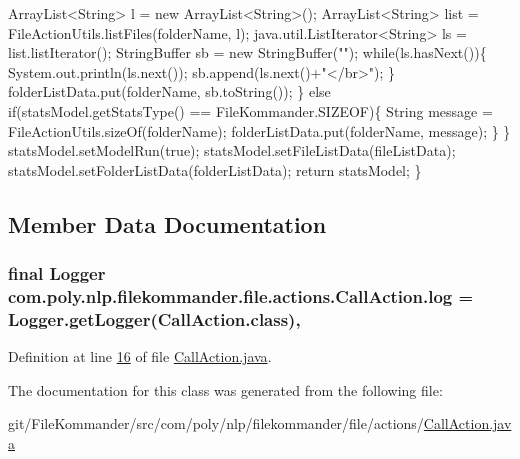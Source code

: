 \begin{DoxyCode}
                ArrayList<String> l = \textcolor{keyword}{new} ArrayList<String>();
                ArrayList<String> list = FileActionUtils.listFiles(folderName, 
      l);
                java.util.ListIterator<String> ls = list.listIterator();
                StringBuffer sb = \textcolor{keyword}{new} StringBuffer(\textcolor{stringliteral}{""});
                \textcolor{keywordflow}{while}(ls.hasNext())\{
                    System.out.println(ls.next());
                    sb.append(ls.next()+\textcolor{stringliteral}{"</br>"});
                \}
                folderListData.put(folderName, sb.toString());
            \} \textcolor{keywordflow}{else} \textcolor{keywordflow}{if}(statsModel.getStatsType() == FileKommander.SIZEOF)\{
                String message = FileActionUtils.sizeOf(folderName);
                folderListData.put(folderName, message);
            \}
        \}
        statsModel.setModelRun(\textcolor{keyword}{true});
        statsModel.setFileListData(fileListData);
        statsModel.setFolderListData(folderListData);
        \textcolor{keywordflow}{return} statsModel;
    \}
\end{DoxyCode}


\subsection{Member Data Documentation}
\hypertarget{classcom_1_1poly_1_1nlp_1_1filekommander_1_1file_1_1actions_1_1_call_action_a65b722d9482bd93c3ae2b31f51050a08}{
\subsubsection[{log}]{\setlength{\rightskip}{0pt plus 5cm}final Logger com.\-poly.\-nlp.\-filekommander.\-file.\-actions.\-Call\-Action.\-log = Logger.\-get\-Logger(Call\-Action.\-class)\hspace{0.3cm}{\ttfamily [static]}, {\ttfamily [private]}}}\label{classcom_1_1poly_1_1nlp_1_1filekommander_1_1file_1_1actions_1_1_call_action_a65b722d9482bd93c3ae2b31f51050a08}


Definition at line \hyperlink{L16}{16} of file \hyperlink{}{Call\-Action.\-java}.



The documentation for this class was generated from the following file\-:\begin{DoxyCompactItemize}
\item 
git/\-File\-Kommander/src/com/poly/nlp/filekommander/file/actions/\hyperlink{_call_action_8java}{Call\-Action.\-java}\end{DoxyCompactItemize}
